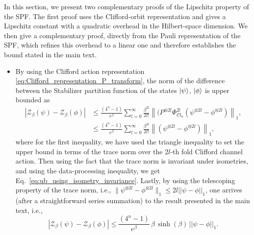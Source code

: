 \documentclass[aps,pra,superscriptaddress,twocolumn,longbibliography]{revtex4-2}
\newcommand{\eqs}[1]{\begin{align}#1\end{align}}
\begin{document}
In this section, we present two complementary proofs of the Lipschitz property of the SPF. The first proof uses the Clifford-orbit representation
and gives a Lipschitz constant with a quadratic overhead in the Hilbert-space dimension. We then give a complementary proof, directly from the Pauli
representation of the SPF, which refines this overhead to a linear one and therefore establishes the bound stated in the main text.

\begin{itemize}
    \item By using the Clifford action representation \eqref{eq:Clifford_representation_P_transform}, the norm of the difference between the Stabilizer partition function of the states $\ket{\psi}$, $\ket{\phi}$ is upper bounded as
%
\eqs{
    |\mathcal{Z}_{\beta}(\psi)-\mathcal{Z}_{\beta}({\phi})| &\leq \frac{(4^{n}-1)}{e^{\beta}}\sum_{l=0}^{\infty}\frac{\beta^{2l}}{2l!}\left\|(P^{\otimes 2l} \Phi_{\mathcal{C}l_{n}}^{2l}\left(\psi^{\otimes 2l}-\phi^{\otimes 2l}\right)\right\|_{1},\\
    &\leq \frac{(4^{n}-1)}{e^{\beta}}\sum_{l=0}^{\infty}\frac{\beta^{2l}}{2l!}\left\|\left(\psi^{\otimes 2l}-\phi^{\otimes 2l}\right)\right\|_{1} \label{eq:ub_using_isometry_invariance},
}
%
where for the first inequality, we have used the triangle inequality  to set the upper bound in terms of the trace norm over the $2l$-th fold Clifford channel action.
Then using the fact that the trace norm is invariant under isometries, and using the data-processing inequality, we get Eq.~\eqref{eq:ub_using_isometry_invariance}.
Lastly, by using the telescoping property of the trace norm, i.e., $\|\psi^{\otimes 2l}-\phi^{\otimes 2l}\|_{1}\leq 2l ||\psi -\phi||_{1}$, one arrives (after a straightforward series summation) to the result presented in the main text, i.e.,
\begin{equation}
    |\mathcal{Z}_{\beta}(\psi)-\mathcal{Z}_{\beta}(\phi)|  \leq \frac{(4^{n}-1)}{e^{\beta}}\,\beta\,\sinh{\left(\beta\right)}\,||\psi-\phi||_{1}.
\end{equation}


\end{itemize}
\end{document}
